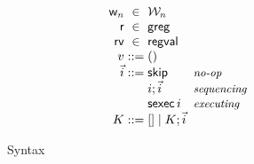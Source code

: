 \begin{figure}[!ht]
\newcommand{\commentary}[1]{ & \text{\small\it #1} \\}
\[
  \begin{array}{r@{\;}c@{\;}l}
    \loc & \in & \Loc \\
    \reg & \in & \regset \\
    \regval & \in & \regvaltype \\
    \val & ::= & \vunit

\\
    \instrs & ::= &
    \begin{array}[t]{@{}l@{\hspace{10mm}}l@{}}
    \begin{array}[t]{@{}ll@{}}
      \iskip
                   \commentary{no-op}
      \iseq\instr\instrs
                   \commentary{sequencing}
      \ising\instr
                   \commentary{executing}             
    \end{array}
    \end{array}
    \\

    \ectx & ::= &
      \hole \mid
      \iseq\ectx\instrs 
    \\
  \end{array}
\]
\caption{Syntax}
\label{fig:syntax}
\end{figure}
